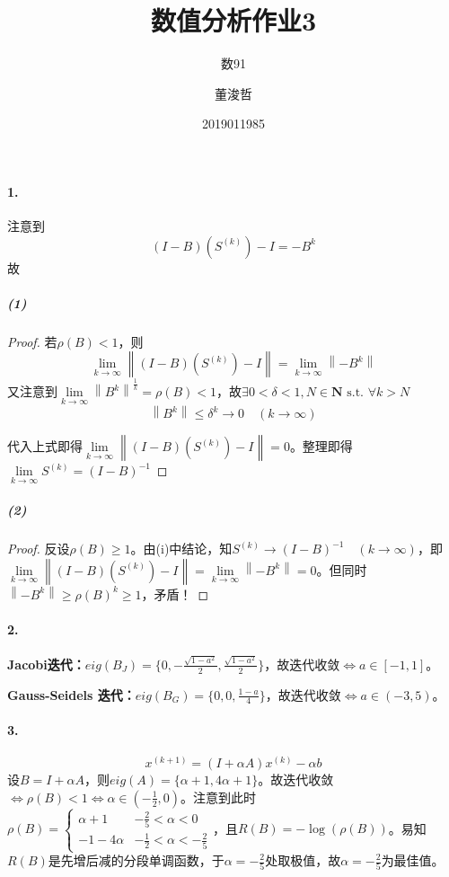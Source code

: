 \documentclass{ctexart}
\title{数值分析作业3}
\author{数91\and 董浚哲\and 2019011985}
\begin{document}
\maketitle
\newcommand{\R}{\mathbf{R}}
\newcommand{\dd}{\,\mathrm{d}}
\newcommand{\st}{\text{ s.t. }}
\newcommand{\pp}[2]{\frac{\partial #1}{\partial #2}}
\newcommand{\nm}[1]{\left\|#1\right\|}

\paragraph{1.}
注意到\[(I-B)(S^{(k)})-I=-B^{k}\]故
\subparagraph{(1)}
\begin{proof}
若$\rho(B)<1$，则
\[\lim_{k\to\infty}\nm{(I-B)(S^{(k)})-I}=\lim_{k\to\infty}\nm{-B^k}\]
又注意到$\lim\limits_{k\to\infty}\nm{B^k}^{\frac 1 k}=\rho(B)<1$，故$\exists 0<\delta<1,N\in\mathbf{N}\st\forall k>N$
\[\nm{B^k}\leq \delta^k\to 0\quad (k\to\infty)\]

代入上式即得$\lim\limits_{k\to\infty}\nm{(I-B)(S^{(k)})-I}=0$。整理即得$\lim\limits_{k\to\infty}S^{(k)}=(I-B)^{-1}$
\end{proof}
\subparagraph{(2)}
\begin{proof}
反设$\rho(B)\geq 1$。由(i)中结论，知$S^{(k)}\to (I-B)^{-1}\quad(k\to\infty)$，即$\lim\limits_{k\to\infty}\nm{(I-B)(S^{(k)})-I}=\lim\limits_{k\to\infty}\nm{-B^k}=0$。但同时$\nm{-B^k}\geq\rho(B)^k\geq 1$，矛盾！
\end{proof}

\paragraph{2.}
\textbf{Jacobi迭代：}$eig(B_J)=\{0,-\frac{\sqrt{1-a^2}}{2},\frac{\sqrt{1-a^2}}{2}\}$，故迭代收敛$\Leftrightarrow a\in [-1,1]$。

\textbf{Gauss-Seidels 迭代：}$eig(B_G)=\{0,0,\frac{1-a}{4}\}$，故迭代收敛$\Leftrightarrow a\in(-3,5)$。

\paragraph{3.}
\[x^{(k+1)}=(I+\alpha A)x^{(k)}-\alpha b\]
设$B=I+\alpha A$，则$eig(A)=\{\alpha+1,4\alpha+1\}$。故迭代收敛$\Leftrightarrow\rho(B)<1\Leftrightarrow \alpha\in(-\frac{1}{2},0)$。注意到此时$\rho(B)=\begin{cases}\alpha+1&-\frac{2}{5}<\alpha<0\\ -1-4\alpha&-\frac{1}{2}<\alpha<-\frac{2}{5}\end{cases}$，且$R(B)=-\log(\rho(B))$。易知$R(B)$是先增后减的分段单调函数，于$\alpha=-\frac{2}{5}$处取极值，故$\alpha=-\frac{2}{5}$为最佳值。
\end{document}
